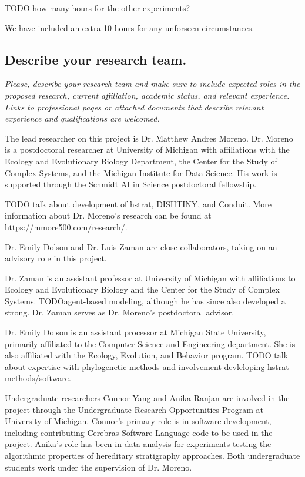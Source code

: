 TODO how many hours for the other experiments?

We have included an extra 10 hours for any unforseen circumstances.

\subsection{Describe your research team.}

\begin{displayquote} \itshape
Please, describe your research team and make sure to include expected roles in the proposed research, current affiliation, academic status, and relevant experience.
Links to professional pages or attached documents that describe relevant experience and qualifications are welcomed.
\end{displayquote}

The lead researcher on this project is Dr. Matthew Andres Moreno.
Dr. Moreno is a postdoctoral researcher at University of Michigan with affiliations with the Ecology and Evolutionary Biology Department, the Center for the Study of Complex Systems, and the Michigan Institute for Data Science.
His work is supported through the Schmidt AI in Science postdoctoral fellowship.

TODO talk about development of hstrat, DISHTINY, and Conduit.
More information about Dr. Moreno's research can be found at \url{https://mmore500.com/research/}.

Dr. Emily Dolson and Dr. Luis Zaman are close collaborators, taking on an advisory role in this project.

Dr. Zaman is an assistant professor at University of Michigan with affiliations to Ecology and Evolutionary Biology and the Center for the Study of Complex Systems.
TODOagent-based modeling, although he has since also developed a strong.
Dr. Zaman serves as Dr. Moreno's postdoctoral advisor.

Dr. Emily Dolson is an assistant processor at Michigan State University, primarily affiliated to the Computer Science and Engineering department.
She is also affiliated with the Ecology, Evolution, and Behavior program.
TODO talk about expertise with phylogenetic methods and involvement devleloping hstrat methods/software.

Undergraduate researchers Connor Yang and Anika Ranjan are involved in the project through the Undergraduate Research Opportunities Program at University of Michigan.
Connor's primary role is in software development, including contributing Cerebras Software Language code to be used in the project.
Anika's role has been in data analysis for experiments testing the algorithmic properties of hereditary stratigraphy approaches.
Both undergraduate students work under the supervision of Dr. Moreno.

